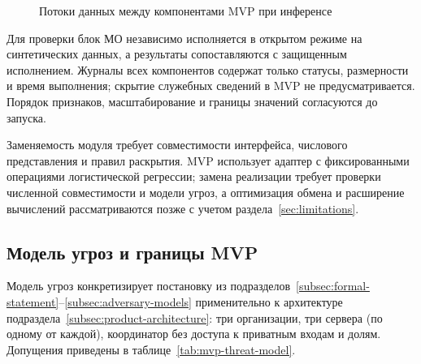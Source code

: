 \begin{figure}[!ht]
\medskip
{}
\caption{Потоки данных между компонентами MVP при инференсе}
\label{fig:mvp-dataflow-infer}
\end{figure}

Для проверки блок МО независимо исполняется в открытом режиме на синтетических данных, а результаты сопоставляются с защищенным исполнением. Журналы всех компонентов содержат только статусы, размерности и время выполнения; скрытие служебных сведений в MVP не предусматривается. Порядок признаков, масштабирование и границы значений согласуются до запуска.

Заменяемость модуля требует совместимости интерфейса, числового представления и правил раскрытия. MVP использует адаптер с фиксированными операциями логистической регрессии; замена реализации требует проверки численной совместимости и модели угроз, а оптимизация обмена и расширение вычислений рассматриваются позже с учетом раздела~\ref{sec:limitations}.

\subsection{Модель угроз и границы MVP}
\label{subsec:mvp-threat-model}

Модель угроз конкретизирует постановку из подразделов~\ref{subsec:formal-statement}--\ref{subsec:adversary-models} применительно к архитектуре подраздела~\ref{subsec:product-architecture}: три организации, три сервера (по одному от каждой), координатор без доступа к приватным входам и долям. Допущения приведены в таблице~\ref{tab:mvp-threat-model}.

